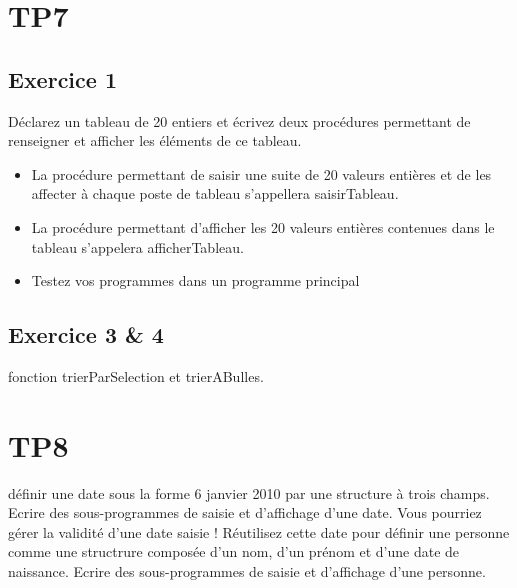 \documentclass{article}
\begin{document}
	\section{TP7}
		\subsection{Exercice 1}
		Déclarez un tableau de 20 entiers et écrivez deux procédures permettant de renseigner et afficher les éléments de ce tableau.
		\begin{itemize}			
			\item La procédure permettant de saisir une suite de 20 valeurs entières et de les affecter à chaque poste de tableau s'appellera saisirTableau.
			\item La procédure permettant d'afficher les 20 valeurs entières contenues dans le tableau s'appelera afficherTableau.
			\item Testez vos programmes dans un programme principal
		\end{itemize}
				
		\subsection{Exercice 3 \& 4}
			fonction trierParSelection et trierABulles.
					
	\section{TP8}
		définir une date sous la forme 6 janvier 2010 par une structure à trois champs. Ecrire des sous-programmes de saisie et d'affichage d'une date. Vous pourriez gérer la validité d'une date saisie ! Réutilisez cette date pour définir une personne comme une structrure composée d'un nom, d'un prénom et d'une date de naissance. Ecrire des sous-programmes de saisie et d'affichage d'une personne.
			
\end{document}
